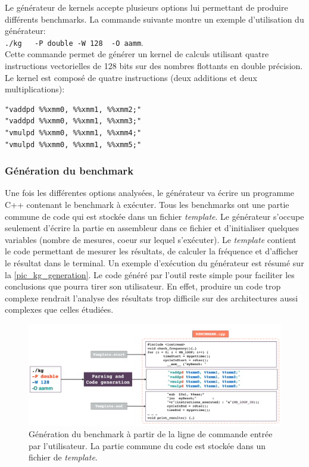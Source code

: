             Le générateur de kernels accepte plusieurs options lui permettant de produire différents benchmarks. La commande suivante montre un exemple d'utilisation du générateur:\\
            \verb|./kg   -P double -W 128  -O aamm|.\\
            Cette commande permet de générer un kernel de calculs utilisant quatre instructions vectorielles de 128 bits sur des nombres flottants en double précision. Le kernel est composé de quatre instructions (deux additions et deux multiplications):
        \begin{verbatim}
"vaddpd %%xmm0, %%xmm1, %%xmm2;"
"vaddpd %%xmm0, %%xmm1, %%xmm3;"
"vmulpd %%xmm0, %%xmm1, %%xmm4;"
"vmulpd %%xmm0, %%xmm1, %%xmm5;"
        \end{verbatim}
        
      
        
    
    \subsubsection{Génération du benchmark}
        
        Une fois les différentes options analysées, le générateur va écrire un programme C++ contenant le benchmark à exécuter. Tous les benchmarks ont une partie commune de code qui est stockée dans un fichier \textit{template}. Le générateur s'occupe seulement d'écrire la partie en assembleur dans ce fichier et d'initialiser quelques variables (nombre de mesures, coeur sur lequel s'exécuter). Le \textit{template} contient le code permettant de mesurer les résultats, de calculer la fréquence et d'afficher le résultat  dans le terminal. Un exemple d'exécution du générateur est résumé sur la \autoref{pic_kg_generation}. Le code généré par l'outil reste simple pour faciliter les conclusions que pourra tirer son utilisateur. En effet, produire un code trop complexe rendrait l'analyse des résultats trop difficile sur des  architectures aussi complexes que celles étudiées. 

        \begin{figure}[h!]
            \center
            \includegraphics[width=16cm]{images/kg_generation.png}
            \caption{\label{pic_kg_generation}Génération du benchmark à partir de la ligne de commande entrée par l'utilisateur. La partie commune du code est stockée dans un fichier de \textit{template}.}
        \end{figure}
        

